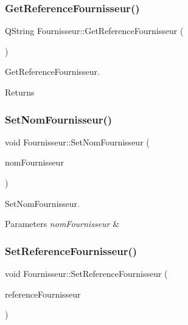 \subsubsection{\texorpdfstring{Get\+Reference\+Fournisseur()}{GetReferenceFournisseur()}}
{\footnotesize\ttfamily Q\+String Fournisseur\+::\+Get\+Reference\+Fournisseur (\begin{DoxyParamCaption}{ }\end{DoxyParamCaption})}



Get\+Reference\+Fournisseur. 

\begin{DoxyReturn}{Returns}

\end{DoxyReturn}
\mbox{\label{class_fournisseur_af4b9f8709e2395729b9853a78f6db4fb}} 
\subsubsection{\texorpdfstring{Set\+Nom\+Fournisseur()}{SetNomFournisseur()}}
{\footnotesize\ttfamily void Fournisseur\+::\+Set\+Nom\+Fournisseur (\begin{DoxyParamCaption}\item[{Q\+String}]{nom\+Fournisseur }\end{DoxyParamCaption})}



Set\+Nom\+Fournisseur. 


\begin{DoxyParams}{Parameters}
{\em nom\+Fournisseur} & \\
\hline
\end{DoxyParams}
\mbox{\label{class_fournisseur_aa0f5a8e72e7394e4d5f886b8ddbab33b}} 
\subsubsection{\texorpdfstring{Set\+Reference\+Fournisseur()}{SetReferenceFournisseur()}}
{\footnotesize\ttfamily void Fournisseur\+::\+Set\+Reference\+Fournisseur (\begin{DoxyParamCaption}\item[{Q\+String}]{reference\+Fournisseur }\end{DoxyParamCaption})}



